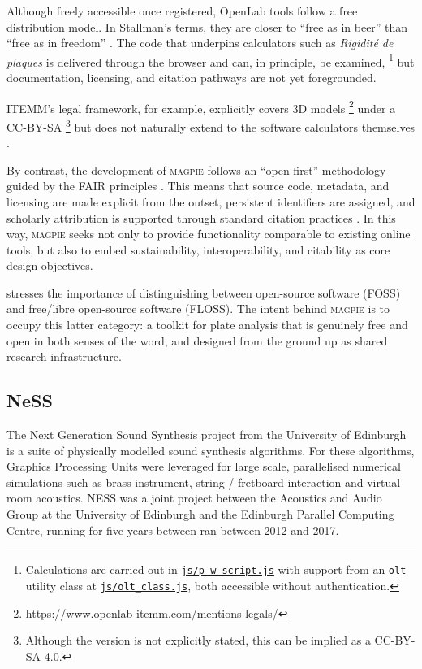 Although freely accessible once registered, OpenLab tools follow a free distribution model. In Stallman’s terms, they are closer to ``free as in beer'' than ``free as in freedom'' \cite{stallman_why_2007}. 
The code that underpins calculators such as \textit{Rigidité de plaques} is delivered through the browser and can, in principle, be examined,
\footnote{Calculations are carried out in \href{https://www.openlab-itemm.com/wp-content/plugins/ITEMM-OpenLab-tools-main/js/p_w_script.js}{\texttt{js/p\_w\_script.js}} with support from an \texttt{olt} utility class at \href{https://www.openlab-itemm.com/wp-content/plugins/ITEMM-OpenLab-tools-main/js/olt_class.js}{\texttt{js/olt\_class.js}}, both accessible without authentication.} 
but documentation, licensing, and citation pathways are not yet foregrounded.

ITEMM’s legal framework, for example, explicitly covers 3D models%
\footnote{\url{https://www.openlab-itemm.com/mentions-legals/}} 
under a CC-BY-SA
\footnote{Although the version is not explicitly stated, this can be implied as a CC-BY-SA-4.0.}
but does not naturally extend to the software calculators themselves \cite{cc_can_2025}. 

By contrast, the development of \textsc{magpie} follows an ``open first'' methodology guided by the FAIR principles \cite{wilkinson_fair_2016,go_fair_2016}. This means that source code, metadata, and licensing are made explicit from the outset, persistent identifiers are assigned, and scholarly attribution is supported through standard citation practices \cite{soito_citations_2016}. In this way, \textsc{magpie} seeks not only to provide functionality comparable to existing online tools, but also to embed sustainability, interoperability, and citability as core design objectives.

\textcite{stallman_floss_2021} stresses the importance of distinguishing between open-source software (FOSS) and free/libre open-source software (FLOSS). The intent behind \textsc{magpie} is to occupy this latter category: a toolkit for plate analysis that is genuinely free and open in both senses of the word, and designed from the ground up as shared research infrastructure.


\subsection{NeSS}

The Next Generation Sound Synthesis project from the University of Edinburgh is a suite of physically modelled sound synthesis algorithms. For these algorithms, Graphics Processing Units were leveraged for large scale, parallelised numerical simulations such as brass instrument, string / fretboard interaction and virtual room acoustics. NESS was a joint project between the Acoustics and Audio Group at the University of Edinburgh and the Edinburgh Parallel Computing Centre, running for five years between ran between 2012 and 2017. 

